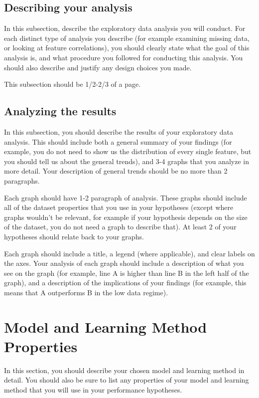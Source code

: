 \documentclass[12pt]{article}
\begin{document}
\subsection{Describing your analysis}

In this subsection, describe the exploratory data analysis you will conduct.  For each distinct type of analysis you describe (for example examining missing data, or looking at feature correlations), you should clearly state what the goal of this analysis is, and what procedure you followed for conducting this analysis.  You should also describe and justify any design choices you made.

This subsection should be 1/2-2/3 of a page.

\subsection{Analyzing the results}

In this subsection, you should describe the results of your exploratory data analysis.  This should include both a general summary of your findings (for example, you do not need to show us the distribution of every single feature, but you should tell us about the general trends), and 3-4 graphs that you analyze in more detail.  Your description of general trends should be no more than 2 paragraphs. 

Each graph should have 1-2 paragraph of analysis.  These graphs should include all of the dataset properties that you use in your hypotheses (except where graphs wouldn't be relevant, for example if your hypothesis depends on the size of the dataset, you do not need a graph to describe that).  At least 2 of your hypotheses should relate back to your graphs.

Each graph should include a title, a legend (where applicable), and clear labels on the axes.  Your analysis of each graph should include a description of what you see on the graph (for example, line A is higher than line B in the left half of the graph), and a description of the implications of your findings (for example, this means that A outperforms B in the low data regime).  

\section{Model and Learning Method Properties}

In this section, you should describe your chosen model and learning method in detail.  You should also be sure to list any properties of your model and learning method that you will use in your performance hypotheses.  
\end{document}
